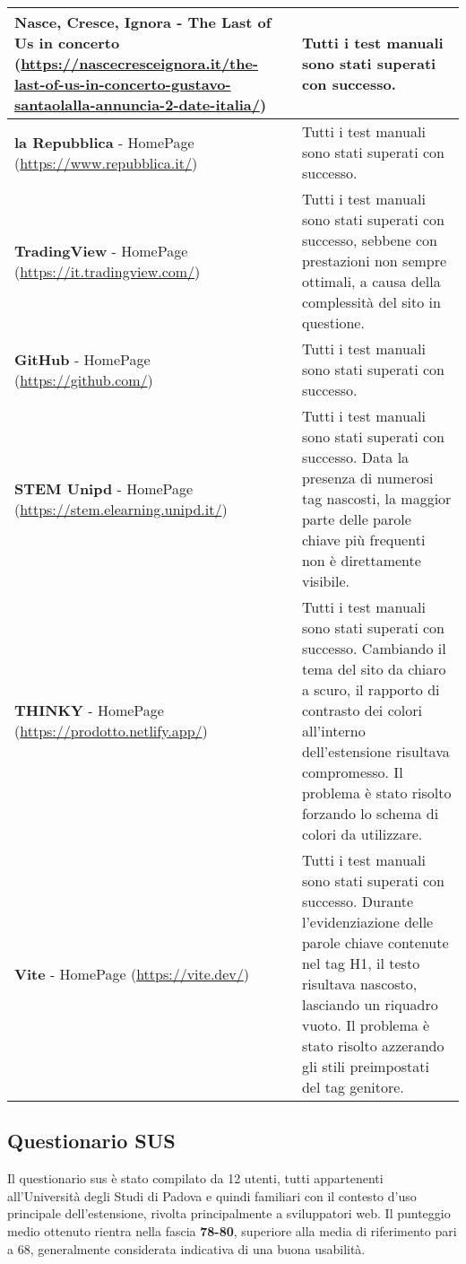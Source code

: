 \begin{tabularx}{\textwidth}{>{\raggedright\arraybackslash}X >{\raggedright\arraybackslash}X}
\hline
\textbf{Nasce, Cresce, Ignora} - The Last of Us in concerto (\url{https://nascecresceignora.it/the-last-of-us-in-concerto-gustavo-santaolalla-annuncia-2-date-italia/}) & Tutti i test manuali sono stati superati con successo. \\
\hline
\textbf{la Repubblica} - HomePage (\url{https://www.repubblica.it/}) & Tutti i test manuali sono stati superati con successo. \\
\hline
\textbf{TradingView} - HomePage (\url{https://it.tradingview.com/}) & Tutti i test manuali sono stati superati con successo, sebbene con prestazioni non sempre ottimali, a causa della complessità del sito in questione. \\
\hline
\textbf{GitHub} - HomePage (\url{https://github.com/}) & Tutti i test manuali sono stati superati con successo. \\
\hline
\textbf{STEM Unipd} - HomePage (\url{https://stem.elearning.unipd.it/}) & Tutti i test manuali sono stati superati con successo. Data la presenza di numerosi tag nascosti, la maggior parte delle parole chiave più frequenti non è direttamente visibile. \\
\hline
\textbf{THINKY} - HomePage (\url{https://prodotto.netlify.app/}) & Tutti i test manuali sono stati superati con successo. Cambiando il tema del sito da chiaro a scuro, il rapporto di contrasto dei colori all’interno dell’estensione risultava compromesso. Il problema è stato risolto forzando lo schema di colori da utilizzare. \\
\hline
\textbf{Vite} - HomePage (\url{https://vite.dev/}) & Tutti i test manuali sono stati superati con successo. Durante l’evidenziazione delle parole chiave contenute nel tag H1, il testo risultava nascosto, lasciando un riquadro vuoto. Il problema è stato risolto azzerando gli stili preimpostati del tag genitore. \\
\end{tabularx}

\vspace{20pt}

\subsection{Questionario SUS}

\par Il questionario \gls{sus} è stato compilato da 12 utenti, tutti appartenenti all’Università degli Studi di Padova e quindi familiari con il contesto d’uso principale dell’estensione, rivolta principalmente a sviluppatori web. Il punteggio medio ottenuto rientra nella fascia \textbf{78-80}, superiore alla media di riferimento pari a 68, generalmente considerata indicativa di una buona usabilità.
